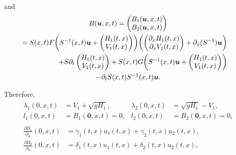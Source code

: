 \par\noindent
\vspace*{-5pt}and\vspace*{-5pt}\enlargethispage{\baselineskip}%
\begin{multline}
\label{defB}
B(\boldsymbol{u},x,t)=\begin{pmatrix}B_{1}(\boldsymbol{u},x,t)\\B_{2}(\boldsymbol{u},x,t)\end{pmatrix}
\\
\shoveright{=S(x,t)F\biggl(S^{-1}(x,t)\boldsymbol{u}+\begin{pmatrix}H_{1}(t,x)\\V_{1}(t,x)\end{pmatrix}\biggr)\biggl(\begin{pmatrix} \partial_{x}H_{1}(t,x)\\ \partial_{x}V_{1}(t,x)\end{pmatrix}+\partial_{x}(S^{-1})\boldsymbol{u}\biggr)}\\
\shoveright{+S\partial_{t}\begin{pmatrix}H_{1}(t,x)\\V_{1}(t,x)\end{pmatrix}+S(x,t)G\biggl(S^{-1}(x,t)\boldsymbol{u}+\begin{pmatrix}H_{1}(t,x)\\V_{1}(t,x)\end{pmatrix}\biggr)}\\
-\partial_{t}S(x,t)S^{-1}(x,t)\boldsymbol{u}.
\end{multline}
\par\noindent
\vspace*{-3pt}Therefore,\vspace*{-2pt}
\begin{gather}
\begin{aligned}
\lambda_{1}(0,x,t)&=V_{1}+\sqrt{gH_{1}},&\lambda_{2}(0,x,t)&=\sqrt{gH_{1}}-V_{1}\label{Lambda},\\
l_{1}(0,x,t)&=B_{1}(\boldsymbol{0},x,t)=0,& l_{2}(0,x,t)&=B_{2}(\boldsymbol{0},x,t)=0,
\end{aligned}
\\
\begin{split}
\frac{\partial{B}_{1}}{\partial_{u}}(0,x,t)&=\gamma_{1}(t,x)u_{1}(t,x)+\gamma_{2}(t,x)u_{2}(t,x),\\
\frac{\partial{B}_{2}}{\partial_{u}}(0,x,t)&=\delta_{1}(t,x)u_{1}(t,x)+\delta_{2}(t,x)u_{2}(t,x),
\end{split}
\label{l1l2}
\end{gather}
